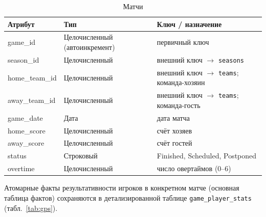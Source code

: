 {\begin{table}[H]
\caption{Матчи}
\label{tab:games}
\centering
\begin{tabular}{|p{}|p{}|p{}|}
\hline
\textbf{Атрибут} & \textbf{Тип} & \textbf{Ключ / назначение} \\
\hline
game\_id & Целочисленный (автоинкремент) & первичный ключ \\
\hline
season\_id & Целочисленный & внешний ключ $\rightarrow$ \texttt{seasons} \\
\hline
home\_team\_id & Целочисленный & внешний ключ $\rightarrow$ \texttt{teams}; команда-хозяин \\
\hline
away\_team\_id & Целочисленный & внешний ключ $\rightarrow$ \texttt{teams}; команда-гость \\
\hline
game\_date & Дата & дата матча \\
\hline
home\_score & Целочисленный & счёт хозяев \\
\hline
away\_score & Целочисленный & счёт гостей \\
\hline
status & Строковый & Finished, Scheduled, Postponed \\
\hline
overtime & Целочисленный & число овертаймов (0--6) \\
\hline
\end{tabular}
\end{table}

{\normalsize
Атомарные факты результативности игроков в конкретном матче (основная таблица
фактов) сохраняются в детализированной таблице \texttt{game\_player\_stats}
(табл.~\ref{tab:gps}).
}

}
